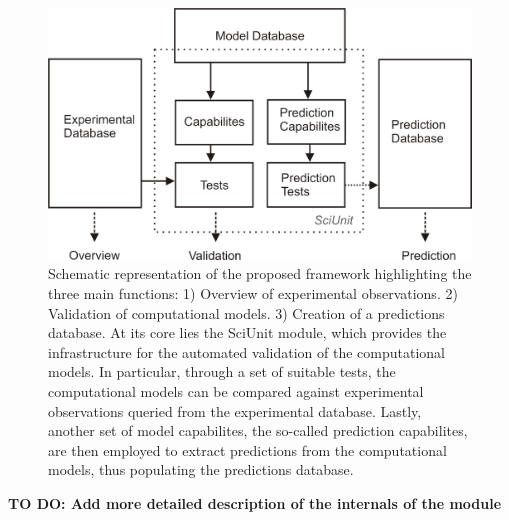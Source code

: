 \documentclass[a4paper,10pt]{article}
\begin{document}
\begin{figure}
\includegraphics[width=\textwidth]{Figures/SciUnit-Paper-Schematic}
\caption{Schematic representation of the proposed framework highlighting the three main functions: 1) Overview of experimental observations. 2) Validation of computational models. 3) Creation of a predictions database. At its core
lies the SciUnit module, which provides the infrastructure for the automated validation of the computational models. In particular, through a set of suitable tests, the computational models can be compared against experimental observations
queried from the experimental database. Lastly, another set of model capabilites, the so-called prediction capabilites, are then employed to extract predictions from the computational models, thus populating the predictions database. }
\label{Fig:Scheme}
\end{figure}


\textbf{TO DO: Add more detailed description of the internals of the module}
\end{document}
